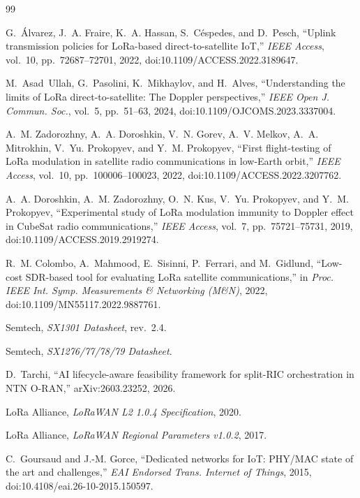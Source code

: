 \documentclass[journal]{IEEEtran}
\begin{document}
\begin{thebibliography}{99}

 G.~\'Alvarez, J.~A. Fraire, K.~A. Hassan, S.~C\'espedes, and D.~Pesch, ``Uplink transmission policies for LoRa-based direct-to-satellite IoT,'' \emph{IEEE Access}, vol.~10, pp.~72687--72701, 2022, doi:10.1109/ACCESS.2022.3189647.

 M.~Asad~Ullah, G.~Pasolini, K.~Mikhaylov, and H.~Alves, ``Understanding the limits of LoRa direct-to-satellite: The Doppler perspectives,'' \emph{IEEE Open J. Commun. Soc.}, vol.~5, pp.~51--63, 2024, doi:10.1109/OJCOMS.2023.3337004.

 A.~M. Zadorozhny, A.~A. Doroshkin, V.~N. Gorev, A.~V. Melkov, A.~A. Mitrokhin, V.~Yu. Prokopyev, and Y.~M. Prokopyev, ``First flight-testing of LoRa modulation in satellite radio communications in low-Earth orbit,'' \emph{IEEE Access}, vol.~10, pp.~100006--100023, 2022, doi:10.1109/ACCESS.2022.3207762.

 A.~A. Doroshkin, A.~M. Zadorozhny, O.~N. Kus, V.~Yu. Prokopyev, and Y.~M. Prokopyev, ``Experimental study of LoRa modulation immunity to Doppler effect in CubeSat radio communications,'' \emph{IEEE Access}, vol.~7, pp.~75721--75731, 2019, doi:10.1109/ACCESS.2019.2919274.

 R.~M. Colombo, A.~Mahmood, E.~Sisinni, P.~Ferrari, and M.~Gidlund, ``Low-cost SDR-based tool for evaluating LoRa satellite communications,'' in \emph{Proc. IEEE Int. Symp. Measurements \& Networking (M\&N)}, 2022, doi:10.1109/MN55117.2022.9887761.

 Semtech, \emph{SX1301 Datasheet}, rev.~2.4.

 Semtech, \emph{SX1276/77/78/79 Datasheet}.

 D.~Tarchi, ``AI lifecycle-aware feasibility framework for split-RIC orchestration in NTN O-RAN,'' arXiv:2603.23252, 2026.

 LoRa Alliance, \emph{LoRaWAN L2 1.0.4 Specification}, 2020.

 LoRa Alliance, \emph{LoRaWAN Regional Parameters v1.0.2}, 2017.

 C.~Goursaud and J.-M. Gorce, ``Dedicated networks for IoT: PHY/MAC state of the art and challenges,'' \emph{EAI Endorsed Trans. Internet of Things}, 2015, doi:10.4108/eai.26-10-2015.150597.


\end{thebibliography}
\end{document}
